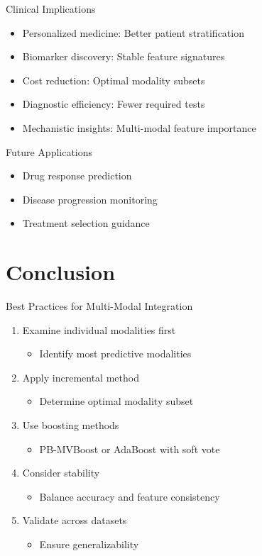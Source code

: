 \documentclass{beamer}
\begin{document}
\begin{frame}{Clinical Implications}
\begin{itemize}
\item \alert{Personalized medicine}: Better patient stratification
\item \alert{Biomarker discovery}: Stable feature signatures
\item \alert{Cost reduction}: Optimal modality subsets
\item \alert{Diagnostic efficiency}: Fewer required tests
\item \alert{Mechanistic insights}: Multi-modal feature importance
\end{itemize}

\begin{block}{Future Applications}
\begin{itemize}
\item Drug response prediction
\item Disease progression monitoring
\item Treatment selection guidance
\end{itemize}
\end{block}
\end{frame}

\section{Conclusion}

\begin{frame}{Best Practices for Multi-Modal Integration}
\begin{enumerate}
\item \alert{Examine individual modalities} first
  \begin{itemize}
  \item Identify most predictive modalities
  \end{itemize}
\item \alert{Apply incremental method}
  \begin{itemize}
  \item Determine optimal modality subset
  \end{itemize}
\item \alert{Use boosting methods}
  \begin{itemize}
  \item PB-MVBoost or AdaBoost with soft vote
  \end{itemize}
\item \alert{Consider stability}
  \begin{itemize}
  \item Balance accuracy and feature consistency
  \end{itemize}
\item \alert{Validate across datasets}
  \begin{itemize}
  \item Ensure generalizability
  \end{itemize}
\end{enumerate}
\end{frame}
\end{document}
